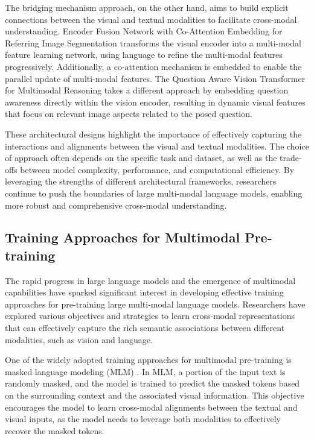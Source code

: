 \documentclass[11pt]{article}
\begin{document}
The bridging mechanism approach, on the other hand, aims to build explicit connections between the visual and textual modalities to facilitate cross-modal understanding. Encoder Fusion Network with Co-Attention Embedding for Referring Image Segmentation \cite{ref115} transforms the visual encoder into a multi-modal feature learning network, using language to refine the multi-modal features progressively. Additionally, a co-attention mechanism is embedded to enable the parallel update of multi-modal features. The Question Aware Vision Transformer for Multimodal Reasoning \cite{ref116} takes a different approach by embedding question awareness directly within the vision encoder, resulting in dynamic visual features that focus on relevant image aspects related to the posed question.

These architectural designs highlight the importance of effectively capturing the interactions and alignments between the visual and textual modalities. The choice of approach often depends on the specific task and dataset, as well as the trade-offs between model complexity, performance, and computational efficiency. By leveraging the strengths of different architectural frameworks, researchers continue to push the boundaries of large multi-modal language models, enabling more robust and comprehensive cross-modal understanding.

\subsection{Training Approaches for Multimodal Pre-training}

The rapid progress in large language models and the emergence of multimodal capabilities have sparked significant interest in developing effective training approaches for pre-training large multi-modal language models. Researchers have explored various objectives and strategies to learn cross-modal representations that can effectively capture the rich semantic associations between different modalities, such as vision and language.

One of the widely adopted training approaches for multimodal pre-training is masked language modeling (MLM) \cite{ref117,ref118,ref119}. In MLM, a portion of the input text is randomly masked, and the model is trained to predict the masked tokens based on the surrounding context and the associated visual information. This objective encourages the model to learn cross-modal alignments between the textual and visual inputs, as the model needs to leverage both modalities to effectively recover the masked tokens.
\end{document}
